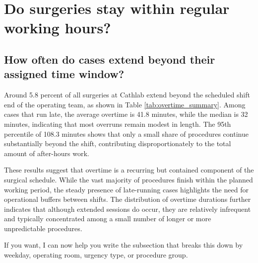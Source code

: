 \documentclass[
]{article}
\begin{document}
\newpage

\section{Do surgeries stay within regular working
hours?}\label{do-surgeries-stay-within-regular-working-hours}

\subsection{How often do cases extend beyond their assigned time
window?}\label{how-often-do-cases-extend-beyond-their-assigned-time-window}

Around 5.8 percent of all surgeries at Cathlab extend beyond the
scheduled shift end of the operating team, as shown in Table
\ref{tab:overtime_summary}. Among cases that run late, the average
overtime is 41.8 minutes, while the median is 32 minutes, indicating
that most overruns remain modest in length. The 95th percentile of 108.3
minutes shows that only a small share of procedures continue
substantially beyond the shift, contributing disproportionately to the
total amount of after-hours work.

These results suggest that overtime is a recurring but contained
component of the surgical schedule. While the vast majority of
procedures finish within the planned working period, the steady presence
of late-running cases highlights the need for operational buffers
between shifts. The distribution of overtime durations further indicates
that although extended sessions do occur, they are relatively infrequent
and typically concentrated among a small number of longer or more
unpredictable procedures.

If you want, I can now help you write the subsection that breaks this
down by weekday, operating room, urgency type, or procedure group.
\end{document}
